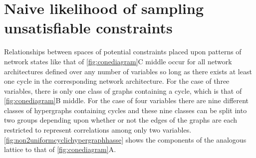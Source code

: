 \section{Naive likelihood of sampling unsatisfiable constraints}\label{sec:volrat}
Relationships between spaces of potential constraints placed upon patterns of network states like that of \ref{fig:conediagram}C middle occur for all network architectures defined over any number of variables so long as there exists at least one cycle in the corresponding network architecture. For the case of three variables, there is only one class of graphs containing a cycle, which is that of \ref{fig:conediagram}B middle. For the case of four variables there are nine different classes of hypergraphs containing cycles and these nine classes can be split into two groups depending upon whether or not the edges of the graphs are each restricted to represent correlations among only two variables. \ref{fig:non2uniformcyclichypergraphhasse} shows the components of the analogous lattice to that of \ref{fig:conediagram}A.

